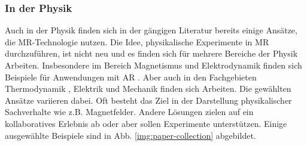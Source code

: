 \subsubsection{In der Physik}
Auch in der Physik finden sich in der gängigen Literatur bereits einige Ansätze, die MR-Technologie nutzen. Die Idee, physikalische Experimente in MR durchzuführen, ist nicht neu und es finden sich für mehrere Bereiche der Physik Arbeiten. Insbesondere im Bereich Magnetismus und Elektrodynamik finden sich Beispiele für Anwendungen mit AR \cite{Ibanez14, Matsutomo13, Mannuss11, Buchau09}. Aber auch in den Fachgebieten Thermodynamik \cite{Strzys17, Strzys18}, Elektrik \cite{Akcayir16, Amiraslanov18, Javaheri18} und Mechanik \cite{Li11, Jerry10, Kaufmann08} finden sich Arbeiten. Die gewählten Ansätze variieren dabei. Oft besteht das Ziel in der Darstellung physikalischer Sachverhalte wie z.B. Magnetfelder. Andere Lösungen zielen auf ein kollaboratives Erlebnis ab oder aber sollen Experimente unterstützen. Einige ausgewählte Beispiele sind in Abb. \ref{img:paper-collection} abgebildet. 

